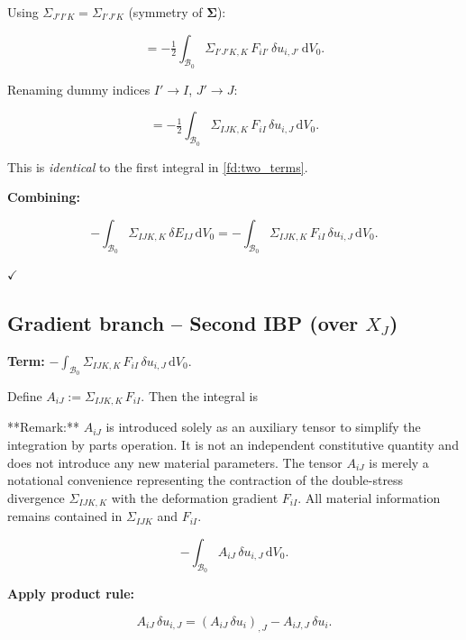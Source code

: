 \documentclass[11pt]{article}
\begin{document}
Using $\Sigma_{J'I'K}=\Sigma_{I'J'K}$ (symmetry of $\boldsymbol{\Sigma}$):

\begin{equation}
= -\tfrac12\int_{\mathcal{B}_{0}}
   \Sigma_{I'J'K,K}\,F_{iI'}\,\delta u_{i,J'}\,
   \mathrm{d}V_{0}.
\end{equation}

Renaming dummy indices $I'\to I$, $J'\to J$:

\begin{equation}
= -\tfrac12\int_{\mathcal{B}_{0}}
   \Sigma_{IJK,K}\,F_{iI}\,\delta u_{i,J}\,
   \mathrm{d}V_{0}.
\end{equation}

This is \emph{identical} to the first integral in \eqref{fd:two_terms}.

\textbf{Combining:}

\begin{equation}
-\int_{\mathcal{B}_{0}}\Sigma_{IJK,K}\,\delta E_{IJ}\,
  \mathrm{d}V_{0}
= -\int_{\mathcal{B}_{0}}\Sigma_{IJK,K}\,F_{iI}\,
  \delta u_{i,J}\,\mathrm{d}V_{0}.
\label{fd:combined_domain}
\end{equation}

$\checkmark$

\subsection{Gradient branch -- Second IBP (over $X_J$)}

\textbf{Term:}
$\displaystyle-\int_{\mathcal{B}_{0}}\Sigma_{IJK,K}\,F_{iI}\,
  \delta u_{i,J}\,\mathrm{d}V_{0}$.

Define $A_{iJ}:=\Sigma_{IJK,K}\,F_{iI}$. Then the integral is

**Remark:** $A_{iJ}$ is introduced solely as an auxiliary tensor to simplify the integration by parts operation. It is not an independent constitutive quantity and does not introduce any new material parameters. The tensor $A_{iJ}$ is merely a notational convenience representing the contraction of the double-stress divergence $\Sigma_{IJK,K}$ with the deformation gradient $F_{iI}$. All material information remains contained in $\Sigma_{IJK}$ and $F_{iI}$.

\begin{equation}
-\int_{\mathcal{B}_{0}}A_{iJ}\,\delta u_{i,J}\,\mathrm{d}V_{0}.
\end{equation}

\textbf{Apply product rule:}

\begin{equation}
A_{iJ}\,\delta u_{i,J}
= (A_{iJ}\,\delta u_{i})_{,J}
- A_{iJ,J}\,\delta u_{i}.
\end{equation}
\end{document}
